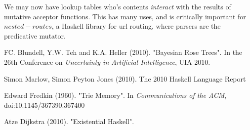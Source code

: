 \documentclass[twoside]{article}
\begin{document}
\begin{multicols}{2}
We may now have lookup tables who's contents \textit{interact} with the results of
mutative acceptor functions. This has many uses, and is critically important
for \(nested-routes\), a Haskell library for url routing, where parsers are the
predicative mutator.


\begin{thebibliography}{99} %

FC. Blundell, Y.W. Teh and K.A. Heller (2010).
\newblock "Bayesian Rose Trees".
\newblock In the 26th Conference on {\em Uncertainty in Artificial Intelligence}, UIA 2010.

Simon Marlow, Simon Peyton Jones (2010).
\newblock The 2010 Haskell Language Report

Edward Fredkin (1960).
\newblock "Trie Memory".
\newblock In {\em Communications of the ACM}, doi:10.1145/367390.367400

Atze Dijkstra (2010).
\newblock "Existential Haskell".


\end{thebibliography}


\end{multicols}
\end{document}
